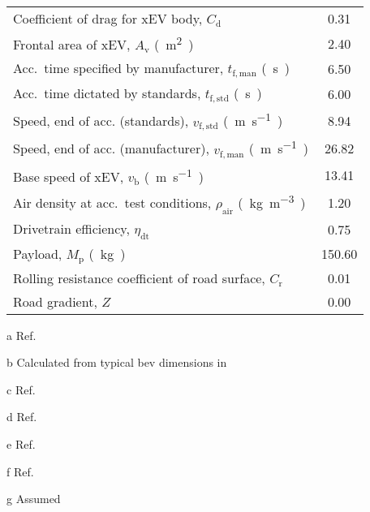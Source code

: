 \begin{table}[!htbp]
\begin{threeparttable}[t]
\begin{tabular}{@{} l  S @{}}
			Coefficient of drag for xEV body, $C_\mathrm{d}$                           & 0.31   {} \\
			Frontal area of xEV, $A_\mathrm{v}$ \si{(m^2)}                             & 2.40   {} \\
			Acc.\ time specified by manufacturer, $t_\mathrm{f,man}$ \si{(s)}          & 6.50   {} \\
			Acc.\ time dictated by standards, $t_\mathrm{f,std}$ \si{(s)}              & 6.00   {} \\
			Speed, end of acc. (standards), $v_\mathrm{f,std}$ \si{(m.s^{-1})}         & 8.94   {} \\
			Speed, end of acc. (manufacturer), $v_\mathrm{f,man}$ \si{(m.s^{-1})}      & 26.82  {} \\
			Base speed of  xEV, $v_\mathrm{b}$ \si{(m.s^{-1})}                         & 13.41  {} \\
			Air density at acc.\ test conditions, $\rho_\mathrm{air}$ \si{(kg.m^{-3})} & 1.20   {} \\
			Drivetrain efficiency, $\eta_\mathrm{dt}$                                  & 0.75   {} \\
			Payload, $M_\mathrm{p}$ \si{(kg)}                                          & 150.60 {} \\
			Rolling resistance coefficient of road surface, $C_\mathrm{r}$             & 0.01   {} \\
			Road gradient, $Z$                                                         & 0.00   {} \\

			\bottomrule
		\end{tabular}
        \begin{tablenotes}
        \item[a]Ref.~\cite{HybridCars2017Drag}
        \item[b]Calculated from typical \gls{bev} dimensions in~\cite{BoltDimensions}
        \item[c]Ref.~\cite{ETANTP002-2004}
        \item[d]Ref.~\cite{BoltOverview}
        \item[e]Ref.~\cite{Liu2016a}
        \item[f]Ref.~\cite{EmadiElectric}
        \item[g]Assumed
        \end{tablenotes}
	\end{threeparttable}
\end{table}
